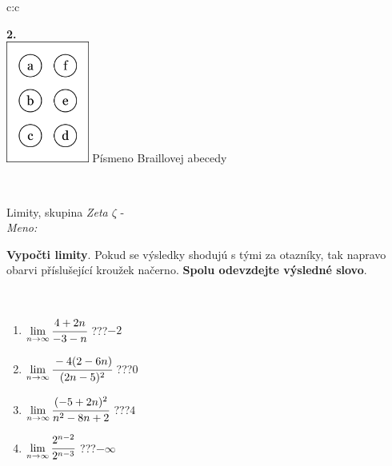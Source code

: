 \documentclass[10pt]{report}
\begin{document}
\begin{tabular}{c:c}
\begin{minipage}[c][104.5mm][t]{0.5\linewidth}
\begin{center}
\begin{minipage}{0.20\linewidth}
\begin{center}
{\Huge\bfseries 2.} \\[2mm]
\includegraphics[height=40mm]{../images/braille.png}
{\small Písmeno Braillovej abecedy}
\end{center}
\end{minipage}
\end{center}
\end{minipage}
\\ \hdashline
\begin{minipage}[c][104.5mm][t]{0.5\linewidth}
\begin{center}
\vspace{7mm}
{\huge Limity, skupina \textit{Zeta $\zeta$} -}\\[5mm]
\textit{Meno:}\phantom{xxxxxxxxxxxxxxxxxxxxxxxxxxxxxxxxxxxxxxxxxxxxxxxxxxxxxxxxxxxxxxxxx}\\[5mm]
\begin{minipage}{0.95\linewidth}
\begin{center}
\textbf{Vypočti limity}. Pokud se výsledky shodujú s tými za otazníky, tak napravo\\obarvi příslušející kroužek načerno. \textbf{Spolu odevzdejte výsledné slovo}.
\end{center}
\end{minipage}
\\[1mm]
\begin{minipage}{0.79\linewidth}
\begin{center}
\begin{varwidth}{\linewidth}
\begin{enumerate}
\normalsize
\item $\lim\limits_{n\to\infty}\cfrac{4+2n}{-3-n}$\quad \dotfill\; ???\;\dotfill \quad $-2$
\item $\lim\limits_{n\to\infty}\cfrac{-4(2-6n)}{(2n-5)^2}$\quad \dotfill\; ???\;\dotfill \quad $0$
\item $\lim\limits_{n\to\infty}\cfrac{(-5+2n)^2}{n^2-8n+2}$\quad \dotfill\; ???\;\dotfill \quad $4$
\item $\lim\limits_{n\to\infty}\cfrac{2^{n-2}}{2^{n-3}}$\quad \dotfill\; ???\;\dotfill \quad $-\infty$

\end{enumerate}
\end{varwidth}
\end{center}
\end{minipage}
\end{center}
\end{minipage}
\end{tabular}
\end{document}
